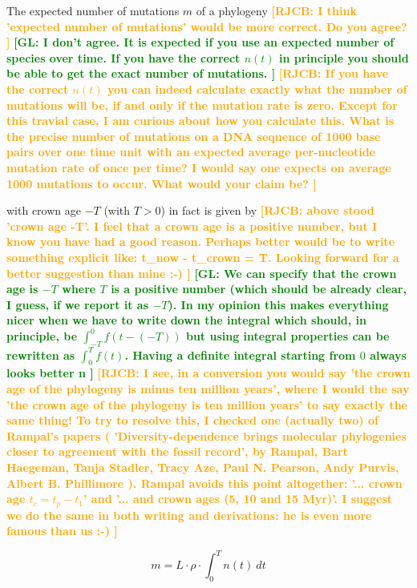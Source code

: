 \documentclass{article}
\newcommand*\richel[1]{\textcolor{orange}{\textbf{[RJCB: #1]}}}
\newcommand*\gio[1]{\textcolor{green}{\textbf{[GL: #1]}}}
\begin{document}
\begin{itemize}
The expected number of mutations $m$ of a phylogeny 
\richel{
  I think 'expected number of mutations' would be more correct.
  Do you agree?
}
\gio{
  I don't agree. It is expected if you use an expected number 
  of species over time. If you have the correct $n(t)$ in principle you 
  should be able to get the exact number of mutations.
}
\richel{
  If you have the correct $n(t)$ you can indeed calculate exactly what
  the number of mutations will be, if and only if the mutation rate is
  zero. Except for this travial case, I am curious about how you
  calculate this. What is the precise number of mutations on a DNA
  sequence of 1000 base pairs over one time unit with an 
  expected average per-nucleotide
  mutation rate of once per time? I would say one expects on average 1000 mutations
  to occur. What would your claim be?
} 

with crown age $-T$ (with $T>0$) in fact is given by
\richel{
  above stood 'crown age -T'. 
  I feel that a crown age is a positive number,
  but I know you have had a good reason.
  Perhaps better would be to write something explicit like:
  t\_now - t\_crown = T.
  Looking forward for a better suggestion than mine :-)
}
\gio{
  We can specify that the crown age is $-T$ where $T$ is a positive number 
  (which should be already clear, I guess, 
  if we report it as $-T$). In my opinion this makes everything 
  nicer when we have to write down the integral which should, 
  in principle, be $\int_{-T}^{0} f(t-(-T))$ but using integral properties 
  can be rewritten as $\int_{0}^{T} f(t)$. Having a definite integral 
  starting from $0$ always looks better ^^.
}
\richel{
  I see, in a conversion you would say 'the crown age of the phylogeny is 
  minus ten million years', where I would the say 'the crown age of the 
  phylogeny is ten million years' to say exactly the same thing!
  To try to resolve this, I checked one (actually two) of Rampal's papers (
    'Diversity-dependence brings molecular phylogenies closer to agreement with the fossil record',
    by Rampal, Bart Haegeman, Tanja Stadler, Tracy Aze, Paul N. Pearson, Andy Purvis, Albert B. Phillimore
  ). Rampal avoids this point altogether: '... crown age $t_c = t_p − t_1$'
  and '... and crown ages (5, 10 and 15 Myr)'. I suggest we do the same in
  both writing and derivations: he is even more famous than us :-) 
}


\begin{equation}
m = L \cdot \rho \cdot \int_{0}^{T} n(t)\ dt \label{m calculation}
\end{equation}


\end{itemize}
\end{document}
